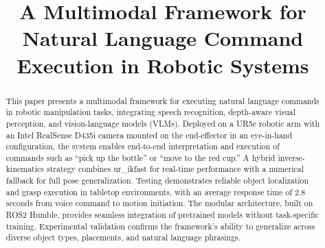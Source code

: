 \documentclass[conference]{IEEEtran}
\begin{document}
\title{A Multimodal Framework for Natural Language Command Execution in Robotic Systems}

\author{
\and
{}
\and
{}
}

\maketitle

\begin{abstract}
This paper presents a multimodal framework for executing natural language commands in robotic manipulation tasks, integrating speech recognition, depth-aware visual perception, and vision-language models (VLMs). Deployed on a UR5e robotic arm with an Intel RealSense D435i camera mounted on the end-effector in an eye-in-hand configuration, the system enables end-to-end interpretation and execution of commands such as ``pick up the bottle'' or ``move to the red cup.'' A hybrid inverse-kinematics strategy combines ur\_ikfast for real-time performance with a numerical fallback for full pose generalization. Testing demonstrates reliable object localization and grasp execution in tabletop environments, with an average response time of 2.8 seconds from voice command to motion initiation. The modular architecture, built on ROS2 Humble, provides seamless integration of pretrained models without task-specific training. Experimental validation confirms the framework's ability to generalize across diverse object types, placements, and natural language phrasings.
\end{abstract}
\end{document}
